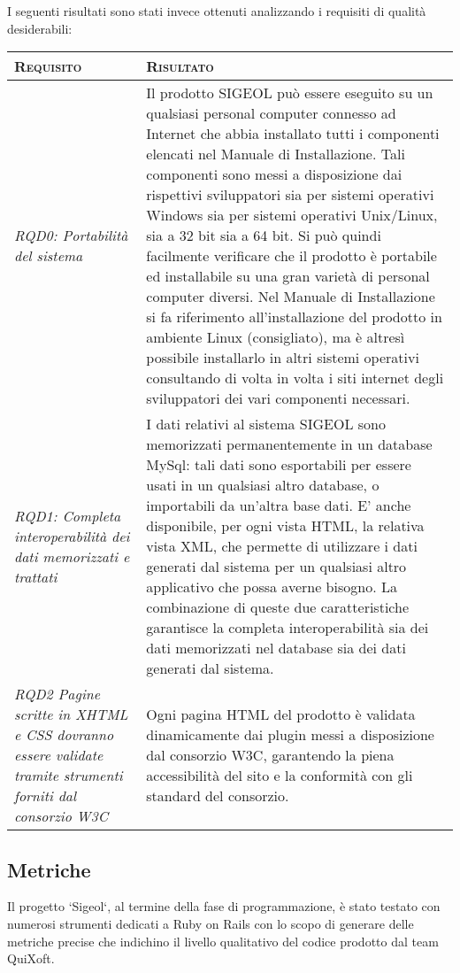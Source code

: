 \documentclass[11pt,a4paper]{article}
\begin{document}
\newpage
I seguenti risultati sono stati invece ottenuti analizzando i requisiti di qualità desiderabili:

\begin{center}
\begin{tabular}{|p{}|p{}|}
\hline
\textsc{Requisito} & \textsc{Risultato} \\
\hline
\hline
\textit{RQD0: Portabilità del sistema} & Il prodotto SIGEOL può essere eseguito su un qualsiasi personal computer connesso ad Internet che abbia
	installato tutti i componenti elencati nel Manuale di Installazione. Tali componenti sono messi a disposizione dai rispettivi sviluppatori
	sia per sistemi operativi Windows sia per sistemi operativi Unix/Linux, sia a 32 bit sia a 64 bit. Si può quindi facilmente verificare
	che il prodotto è portabile ed installabile su una gran varietà di personal computer diversi. Nel Manuale di Installazione si fa 
	riferimento all'installazione del prodotto in ambiente Linux (consigliato), ma è altresì possibile installarlo in altri sistemi operativi
	consultando di volta in volta i siti internet degli sviluppatori dei vari componenti necessari.\\
\hline
\textit{RQD1: Completa interoperabilità dei dati memorizzati e trattati} & I dati relativi al sistema SIGEOL sono memorizzati permanentemente 
	in un database MySql: tali dati sono esportabili per essere usati in un qualsiasi altro database, o importabili da un'altra base dati.
	E' anche disponibile, per ogni vista HTML, la relativa vista XML, che permette di utilizzare i dati generati dal sistema per un qualsiasi
	altro applicativo che possa averne bisogno. La combinazione di queste due caratteristiche garantisce la completa interoperabilità sia dei
	dati memorizzati nel database sia dei dati generati dal sistema.   \\
\hline
\textit{RQD2 Pagine scritte in XHTML e CSS dovranno essere validate tramite strumenti forniti dal consorzio W3C} & Ogni pagina HTML del prodotto 
	è validata dinamicamente dai plugin messi a disposizione dal consorzio W3C, garantendo la piena accessibilità del sito e la 
	conformità con gli standard del consorzio.  \\
\hline
\end{tabular}
\end{center}

\subsection{Metriche}
Il progetto `Sigeol`, al termine della fase di programmazione, è stato testato con numerosi strumenti dedicati a Ruby on Rails con lo scopo di generare delle metriche precise che indichino il livello qualitativo del codice prodotto dal team QuiXoft.
\end{document}
